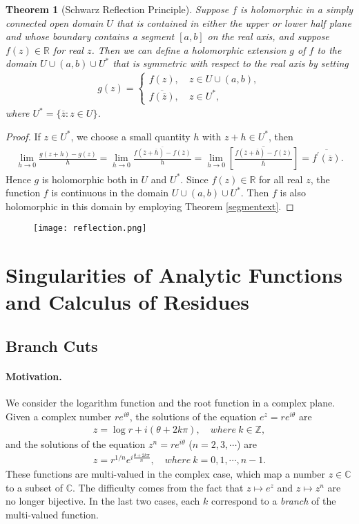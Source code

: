 \documentclass{article}
\numberwithin{equation}{section}
\newcommand{\bbC}{\mathbb{C}}
\newcommand{\bbR}{\mathbb{R}}
\newcommand{\bbZ}{\mathbb{Z}}
\newcommand{\ol}{\overline}
\theoremstyle{plain}
\newtheorem{theorem}{Theorem}[section]
\theoremstyle{definition}
\begin{document}
\begin{theorem}[Schwarz Reflection Principle]
Suppose $f$ is holomorphic in a simply connected open domain $U$ that is contained in either the upper or lower half plane and whose boundary contains a segment $[a,b]$ on the real axis, and suppose
$f(z)\in\bbR$ for real $z$. Then we can define a holomorphic extension $g$ of $f$ to the domain $U\cup (a,b)\cup U^*$ that is symmetric with respect to the real axis by setting
\begin{align*}
	g(z)=\begin{cases}
		f(z),\ &z\in U\cup (a,b),\\
		\ol{f(\ol{z})}, & z\in U^*,
	\end{cases}
\end{align*}
where $U^*=\{\ol{z}:z\in U\}$.
\end{theorem}
\begin{proof}
If $z\in U^*$, we choose a small quantity $h$ with $z+h\in U^*$, then
\begin{align*}
	\lim_{h\to 0}\frac{g(z+h)-g(z)}{h}=\lim_{h\to 0}\frac{\ol{f(\ol{z}+\ol{h})-f(\ol{z})}}{h}=\lim_{h\to 0}\ol{\left[\frac{f(\ol{z}+\ol{h})-f(\ol{z})}{\ol{h}}\right]}=\ol{f^\prime(\ol{z})}.
\end{align*}
Hence $g$ is holomorphic both in $U$ and $U^*$. Since $f(z)\in\bbR$ for all real $z$, the function $f$ is continuous in the domain $U\cup (a,b)\cup U^*$. Then $f$ is also holomorphic in this domain by employing Theorem \ref{segmentext}.
\end{proof}
\begin{figure}[H]
\centering
\texttt{[image: reflection.png]}
\end{figure}
\newpage
\section{Singularities of Analytic Functions and Calculus of Residues}
\subsection{Branch Cuts}
\paragraph{Motivation.} We consider the logarithm function and the root function in a complex plane. Given a complex number $re^{i\theta}$, the solutions of the equation $e^z=re^{i\theta}$ are
\begin{align*}
	z=\log r+ i(\theta+2k\pi),\quad where\ k\in\bbZ,
\end{align*}
and the solutions of the equation $z^n=re^{i\theta}$ ($n=2,3,\cdots$) are
\begin{align*}
	z=r^{1/n}e^{i\frac{\theta+2k\pi}{n}},\quad where\ k=0,1,\cdots,n-1.
\end{align*}
These functions are multi-valued in the complex case, which map a number $z\in\bbC$ to a subset of $\bbC$. The difficulty comes from the fact that $z\mapsto e^z$ and $z\mapsto z^n$ are no longer bijective. In the last two cases, each $k$ correspond to a \textit{branch} of the multi-valued function. 
\end{document}

